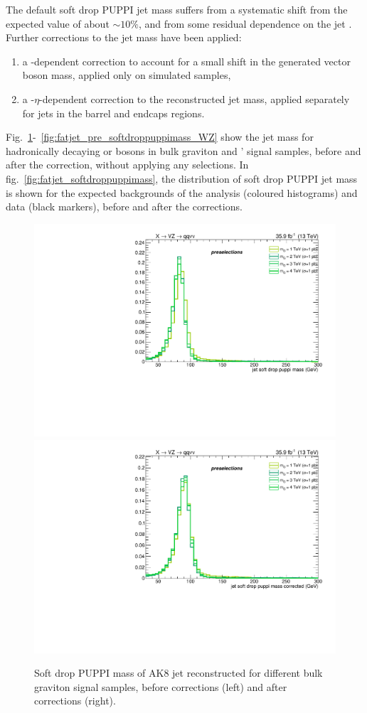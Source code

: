 \vspace*{1\baselineskip}

\noindent The default soft drop PUPPI jet mass suffers from a systematic shift from the expected value of about $\sim 10\%$, and from some residual dependence on the jet \pt. Further corrections to the jet mass have been applied:

\begin{enumerate}
  \item a \pt-dependent correction to account for a small shift in the generated vector boson mass, applied only on simulated samples,
  \item a \pt-$\eta$-dependent correction to the reconstructed jet mass, applied separately for jets in the barrel and endcaps regions.
\end{enumerate}

\noindent Fig.~\ref{fig:fatjet_pre_softdroppuppimass_ZZ}-~\ref{fig:fatjet_pre_softdroppuppimass_WZ} show the jet mass for hadronically decaying \W or \Z bosons in bulk graviton and \W' signal samples, before and after the correction, without applying any selections. In fig.~\ref{fig:fatjet_softdroppuppimass}, the distribution of soft drop PUPPI jet mass is shown for the expected backgrounds of the analysis (coloured histograms) and data (black markers), before and after the corrections.

\begin{figure}[!htb]
  \begin{center}
    \includegraphics[width=.495\textwidth]{plots/v9_thesis/XVZnnPre/FatJet1_softdropPuppiMass_signalZZ.pdf}
    \includegraphics[width=.495\textwidth]{plots/v9_thesis/XVZnnPre/FatJet1_softdropPuppiMassCorr_signalZZ.pdf}
  \end{center}
  \caption{Soft drop PUPPI mass of AK8 jet reconstructed for different bulk graviton signal samples, before corrections (left) and after corrections (right).}
  \label{fig:fatjet_pre_softdroppuppimass_ZZ}
\end{figure}

